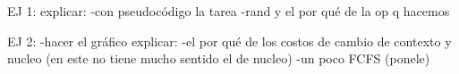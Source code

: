 EJ 1:
explicar:
-con pseudocódigo la tarea
-rand y el por qué de la op q hacemos

EJ 2:
-hacer el gráfico
explicar:
-el por qué de los costos de cambio de contexto y nucleo (en este no tiene mucho sentido el de nucleo)
-un poco FCFS (ponele)